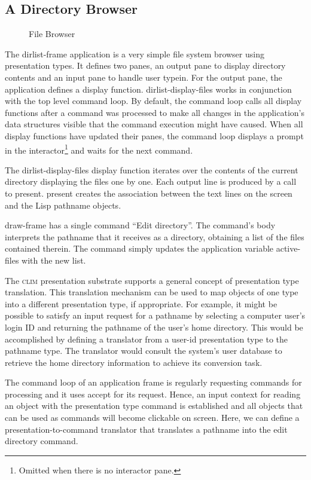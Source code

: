 \documentclass[twocolumn,a4paper]{article}
\newcommand {\code}[1]{{\sffamily #1}}
\newcommand {\CLIM}{\textsc{clim}}
\let\class\code
\let\method\code
\let\variable\code
\begin{document}
\subsection{A Directory Browser}
\begin{figure*}
\lstset{style=framestyle}

\caption{File Browser}\label{fig-file-browser}
\end{figure*}

The \class{dirlist-frame} application is a very simple file
system browser using presentation types.  It defines two panes, an
output pane to display directory contents and an input pane to handle
user typein.  For the output pane, the application defines a display
function. \code{dirlist-display-files} works in conjunction with the
top level command loop. By default, the command loop calls all
display functions after a command was processed to make all changes in
the application's data structures visible that the command execution
might have caused. When all display functions have updated their
panes, the command loop displays a prompt in the
interactor\footnote{Omitted when there is no interactor pane.}
and waits for the next command.

The \method{dirlist-display-files} display function iterates over the
contents of the current directory displaying the files one by one.
Each output line is produced by a call to \method{present}.
\method{present} creates the association between the text lines on the
screen and the Lisp pathname objects.

\class{draw-frame} has a single command ``Edit directory''. The
command's body interprets the pathname that it receives as a
directory, obtaining a list of the files contained therein. The
command simply updates the application variable
\variable{active-files} with the new list.

The \CLIM{} presentation substrate supports a general concept of
presentation type translation. This translation mechanism can be used
to map objects of one type into a different presentation type, if
appropriate. For example, it might be possible to satisfy an input
request for a pathname by selecting a computer user's login ID and
returning the pathname of the user's home directory. This would be
accomplished by defining a translator from a user-id presentation type
to the pathname type. The translator would consult the system's user
database to retrieve the home directory information to achieve its
conversion task.

The command loop of an application frame is regularly requesting
commands for processing and it uses \method{accept} for its request.
Hence, an input context for reading an object with the presentation
type \class{command} is established and all objects that can be used
as commands will become clickable on screen. Here, we can define a
presentation-to-command translator that translates a pathname into the
edit directory command.
\end{document}
